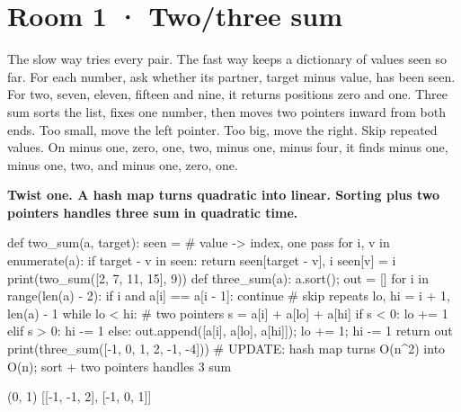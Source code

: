 \documentclass[11pt,a4paper]{report}
\begin{document}
\section*{Room 1 · Two/three sum}
The slow way tries every pair. The fast way keeps a dictionary of values seen so far. For each number, ask whether its partner, target minus value, has been seen. For two, seven, eleven, fifteen and nine, it returns positions zero and one. Three sum sorts the list, fixes one number, then moves two pointers inward from both ends. Too small, move the left pointer. Too big, move the right. Skip repeated values. On minus one, zero, one, two, minus one, minus four, it finds minus one, minus one, two, and minus one, zero, one.
\begin{tcolorbox}[colback=yellow!12,colframe=orange!70!black,boxrule=0.4pt,left=4pt,right=4pt,top=2pt,bottom=2pt]\textbf{Twist one. A hash map turns quadratic into linear. Sorting plus two pointers handles three sum in quadratic time.}\end{tcolorbox}
\begin{Code}
def two_sum(a, target):
    seen = {}                               # value -> index, one pass
    for i, v in enumerate(a):
        if target - v in seen: return seen[target - v], i
        seen[v] = i
print(two_sum([2, 7, 11, 15], 9))
def three_sum(a):
    a.sort(); out = []
    for i in range(len(a) - 2):
        if i and a[i] == a[i - 1]: continue            # skip repeats
        lo, hi = i + 1, len(a) - 1
        while lo < hi:                                  # two pointers
            s = a[i] + a[lo] + a[hi]
            if s < 0: lo += 1
            elif s > 0: hi -= 1
            else: out.append([a[i], a[lo], a[hi]]); lo += 1; hi -= 1
    return out
print(three_sum([-1, 0, 1, 2, -1, -4]))
# UPDATE: hash map turns O(n^2) into O(n); sort + two pointers handles 3 sum
\end{Code}
\begin{Out}
(0, 1)
[[-1, -1, 2], [-1, 0, 1]]
\end{Out}
\end{document}
